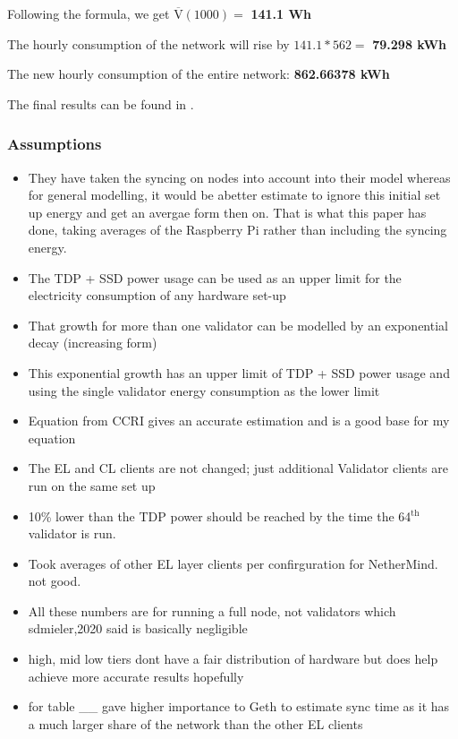 Following the formula, we get $\boldsymbol{\mathrm{\overline{V}(\mathrm{1000})}} =$ \textbf{141.1 Wh}

The hourly consumption of the network will rise by $141.1 * 562 = $ \textbf{79.298 kWh}

The new hourly consumption of the entire network: \textbf{862.66378 kWh} 

The final results can be found in .



\subsubsection{Assumptions}
\label{Assumptions}

\begin{itemize}
    \item They have taken the syncing on nodes into account into their model whereas for general modelling, it would be  abetter estimate to ignore this initial set up energy and get an avergae form then on. That is what this paper has done, taking averages of the Raspberry Pi rather than including the syncing energy.
    \item The TDP + SSD power usage can be used as an upper limit for the electricity consumption of any hardware set-up
    \item That growth for more than one validator can be modelled by an exponential decay (increasing form)
    \item This exponential growth has an upper limit of TDP + SSD power usage and using the single validator energy consumption as the lower limit
    \item Equation from CCRI gives an accurate estimation and is a good base for my equation
    \item The EL and CL clients are not changed; just additional Validator clients are run on the same set up
    \item 10\% lower than the TDP power should be reached by the time the 64$^\mathrm{{th}}$ validator is run.
    \item Took averages of other EL layer clients per confirguration for NetherMind. not good.
    \item All these numbers are for running a full node, not validators which sdmieler,2020 said is basically negligible
    \item high, mid low tiers dont have a fair distribution of hardware but does help achieve more accurate results hopefully
    \item for table \_\_ gave higher importance to Geth to estimate sync time as it has a much larger share of the network than the other EL clients
\end{itemize}

